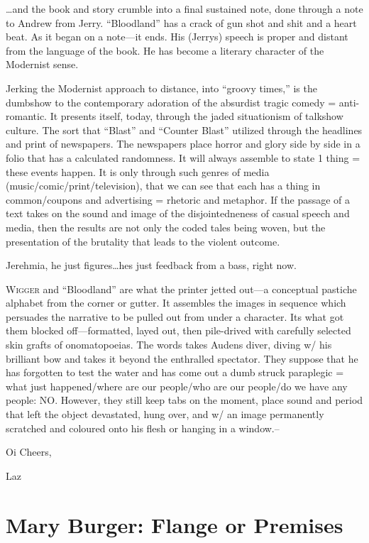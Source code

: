 \documentclass[
]{memoir}
\begin{document}
\ldots{}and the book and story crumble into a final sustained note, done
through a note to Andrew from Jerry. ``Bloodland'' has a crack of gun
shot and shit and a heart beat. As it began on a note---it ends. His
(Jerrys) speech is proper and distant from the language of the book. He
has become a literary character of the Modernist sense.

Jerking the Modernist approach to distance, into ``groovy times,'' is
the dumbshow to the contemporary adoration of the absurdist tragic
comedy = anti-romantic. It presents itself, today, through the jaded
situationism of talkshow culture. The sort that ``Blast'' and ``Counter
Blast'' utilized through the headlines and print of newspapers. The
newspapers place horror and glory side by side in a folio that has a
calculated randomness. It will always assemble to state 1 thing = these
events happen. It is only through such genres of media
(music/comic/print/television), that we can see that each has a thing in
common/coupons and advertising = rhetoric and metaphor. If the passage
of a text takes on the sound and image of the disjointedneness of casual
speech and media, then the results are not only the coded tales being
woven, but the presentation of the brutality that leads to the violent
outcome.

Jerehmia, he just figures\ldots{}hes just feedback from a bass, right
now.

\textsc{Wigger} and ``Bloodland'' are what the printer jetted out---a
conceptual pastiche alphabet from the corner or gutter. It assembles the
images in sequence which persuades the narrative to be pulled out from
under a character. Its what got them blocked off---formatted, layed out,
then pile-drived with carefully selected skin grafts of onomatopoeias.
The words takes Audens diver, diving w/ his brilliant bow and takes it
beyond the enthralled spectator. They suppose that he has forgotten to
test the water and has come out a dumb struck paraplegic = what just
happened/where are our people/who are our people/do we have any people:
NO. However, they still keep tabs on the moment, place sound and period
that left the object devastated, hung over, and w/ an image permanently
scratched and coloured onto his flesh or hanging in a window.--

Oi Cheers,

Laz

\hypertarget{mary-burger-flange-or-premises}{%
\chapter{Mary Burger: Flange or
Premises}\label{mary-burger-flange-or-premises}}
\end{document}
